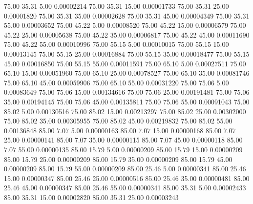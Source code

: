      75.00     35.31      5.00     0.00002214
     75.00     35.31     15.00     0.00001733
     75.00     35.31     25.00     0.00001820
     75.00     35.31     35.00     0.00002628
     75.00     35.31     45.00     0.00004349
     75.00     35.31     55.00     0.00003652
     75.00     45.22      5.00     0.00008520
     75.00     45.22     15.00     0.00006579
     75.00     45.22     25.00     0.00005638
     75.00     45.22     35.00     0.00006817
     75.00     45.22     45.00     0.00011690
     75.00     45.22     55.00     0.00010996
     75.00     55.15      5.00     0.00010015
     75.00     55.15     15.00     0.00013145
     75.00     55.15     25.00     0.00016884
     75.00     55.15     35.00     0.00018477
     75.00     55.15     45.00     0.00016850
     75.00     55.15     55.00     0.00011591
     75.00     65.10      5.00     0.00027511
     75.00     65.10     15.00     0.00051960
     75.00     65.10     25.00     0.00078527
     75.00     65.10     35.00     0.00081746
     75.00     65.10     45.00     0.00059906
     75.00     65.10     55.00     0.00031220
     75.00     75.06      5.00     0.00083649
     75.00     75.06     15.00     0.00134616
     75.00     75.06     25.00     0.00191481
     75.00     75.06     35.00     0.00194145
     75.00     75.06     45.00     0.00135811
     75.00     75.06     55.00     0.00091043
     75.00     85.02      5.00     0.00130516
     75.00     85.02     15.00     0.00213297
     75.00     85.02     25.00     0.00302000
     75.00     85.02     35.00     0.00305955
     75.00     85.02     45.00     0.00219832
     75.00     85.02     55.00     0.00136848
     85.00      7.07      5.00     0.00000163
     85.00      7.07     15.00     0.00000168
     85.00      7.07     25.00     0.00000141
     85.00      7.07     35.00     0.00000115
     85.00      7.07     45.00     0.00000118
     85.00      7.07     55.00     0.00000135
     85.00     15.79      5.00     0.00000209
     85.00     15.79     15.00     0.00000209
     85.00     15.79     25.00     0.00000209
     85.00     15.79     35.00     0.00000209
     85.00     15.79     45.00     0.00000209
     85.00     15.79     55.00     0.00000209
     85.00     25.46      5.00     0.00000341
     85.00     25.46     15.00     0.00000347
     85.00     25.46     25.00     0.00000516
     85.00     25.46     35.00     0.00000481
     85.00     25.46     45.00     0.00000347
     85.00     25.46     55.00     0.00000341
     85.00     35.31      5.00     0.00002433
     85.00     35.31     15.00     0.00002820
     85.00     35.31     25.00     0.00003243
